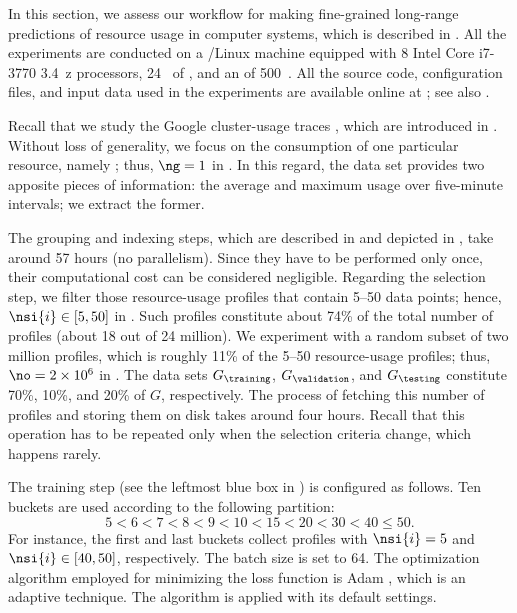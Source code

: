 In this section, we assess our workflow for making fine-grained long-range
predictions of resource usage in computer systems, which is described in
. All the experiments are conducted on a /Linux
machine equipped with 8 Intel Core i7-3770 3.4~z processors, 24~
of , and an  of 500~. All the source code, configuration
files, and input data used in the experiments are available online at
\cite{eslab2017b}; see also \cite{eslab2017c}.


Recall that we study the Google cluster-usage traces \cite{reiss2011}, which are
introduced in . Without loss of generality, we focus
on the consumption of one particular resource, namely ; thus, $\ng = 1$
in . In this regard, the data set provides two apposite
pieces of information: the average and maximum  usage over five-minute
intervals; we extract the former.

The grouping and indexing steps, which are described in
 and depicted in , take around 57
hours (no parallelism). Since they have to be performed only once, their
computational cost can be considered negligible. Regarding the selection step,
we filter those resource-usage profiles that contain 5--50 data points; hence,
$\nsi{i} \in [5, 50]$ in . Such profiles constitute about
74\% of the total number of profiles (about 18 out of 24 million). We experiment
with a random subset of two million profiles, which is roughly 11\% of the 5--50
resource-usage profiles; thus, $\no = 2 \times 10^6$ in .
The data sets $G_\training$, $G_\validation$, and $G_\testing$ constitute 70\%,
10\%, and 20\% of $G$, respectively. The process of fetching this number of
profiles and storing them on disk takes around four hours. Recall that this
operation has to be repeated only when the selection criteria change, which
happens rarely.


The training step (see the leftmost blue box in ) is
configured as follows. Ten buckets are used according to the following
partition:
\[
  5 < 6 < 7 < 8 < 9 < 10 < 15 < 20 < 30 < 40 \leq 50.
\]
For instance, the first and last buckets collect profiles with $\nsi{i} = 5$ and
$\nsi{i} \in [40, 50]$, respectively. The batch size \nb is set to 64. The
optimization algorithm employed for minimizing the loss function is Adam
\cite{kingma2014}, which is an adaptive technique. The algorithm is applied with
its default settings.

